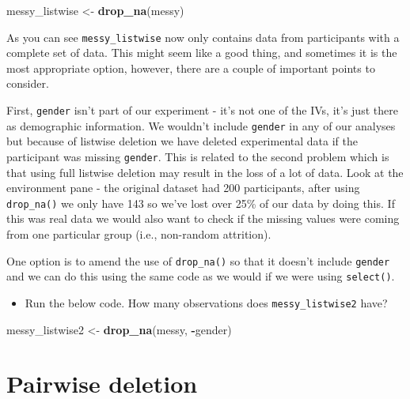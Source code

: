 \documentclass[]{book}
\newenvironment{Shaded}{\begin{snugshade}}{\end{snugshade}}
\newcommand{\KeywordTok}[1]{\textcolor[rgb]{0.13,0.29,0.53}{\textbf{#1}}}
\newcommand{\NormalTok}[1]{#1}
\newcommand{\OperatorTok}[1]{\textcolor[rgb]{0.81,0.36,0.00}{\textbf{#1}}}
\newcommand{\StringTok}[1]{\textcolor[rgb]{0.31,0.60,0.02}{#1}}
\providecommand{\tightlist}{%
  \setlength{\itemsep}{0pt}\setlength{\parskip}{0pt}}
\begin{document}
\begin{Shaded}
\begin{Highlighting}[]
\NormalTok{messy_listwise <-}\StringTok{ }\KeywordTok{drop_na}\NormalTok{(messy)}
\end{Highlighting}
\end{Shaded}

As you can see \texttt{messy\_listwise} now only contains data from participants with a complete set of data. This might seem like a good thing, and sometimes it is the most appropriate option, however, there are a couple of important points to consider.

First, \texttt{gender} isn't part of our experiment - it's not one of the IVs, it's just there as demographic information. We wouldn't include \texttt{gender} in any of our analyses but because of listwise deletion we have deleted experimental data if the participant was missing \texttt{gender}. This is related to the second problem which is that using full listwise deletion may result in the loss of a lot of data. Look at the environment pane - the original dataset had 200 participants, after using \texttt{drop\_na()} we only have 143 so we've lost over 25\% of our data by doing this. If this was real data we would also want to check if the missing values were coming from one particular group (i.e., non-random attrition).

One option is to amend the use of \texttt{drop\_na()} so that it doesn't include \texttt{gender} and we can do this using the same code as we would if we were using \texttt{select()}.

\begin{itemize}
\tightlist
\item
  Run the below code. How many observations does \texttt{messy\_listwise2} have? 
\end{itemize}

\begin{Shaded}
\begin{Highlighting}[]
\NormalTok{messy_listwise2 <-}\StringTok{ }\KeywordTok{drop_na}\NormalTok{(messy, }\OperatorTok{-}\NormalTok{gender)}
\end{Highlighting}
\end{Shaded}

\hypertarget{pairwise-deletion}{%
\section{Pairwise deletion}\label{pairwise-deletion}}
\end{document}
